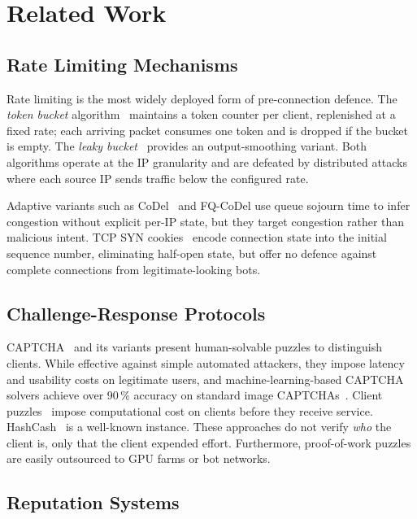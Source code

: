 \documentclass[10pt,conference]{IEEEtran}
\begin{document}
\section{Related Work}
\label{sec:related}

\subsection{Rate Limiting Mechanisms}

Rate limiting is the most widely deployed form of pre-connection
defence.  The \emph{token bucket} algorithm~\cite{tanenbaum2011cn}
maintains a token counter per client, replenished at a fixed rate;
each arriving packet consumes one token and is dropped if the bucket
is empty.  The \emph{leaky bucket}~\cite{turner1986leaky} provides
an output-smoothing variant.  Both algorithms operate at the IP
granularity and are defeated by distributed attacks where each source
IP sends traffic below the configured rate.

Adaptive variants such as CoDel~\cite{nichols2012controlling} and
FQ-CoDel use queue sojourn time to infer congestion without explicit
per-IP state, but they target congestion rather than malicious intent.
TCP SYN cookies~\cite{bernstein1996syncookies} encode connection state
into the initial sequence number, eliminating half-open state, but
offer no defence against complete connections from legitimate-looking
bots.

\subsection{Challenge-Response Protocols}

CAPTCHA~\cite{vonahn2003captcha} and its variants present human-solvable
puzzles to distinguish clients.  While effective against simple
automated attackers, they impose latency and usability costs on
legitimate users, and machine-learning-based CAPTCHA solvers achieve
over 90\,\% accuracy on standard image CAPTCHAs~\cite{captchasolvml}.
Client puzzles~\cite{dwork1993pricing} impose computational cost on
clients before they receive service.  HashCash~\cite{back2002hashcash}
is a well-known instance.  These approaches do not verify
\emph{who} the client is, only that the client expended effort.
Furthermore, proof-of-work puzzles are easily outsourced to GPU farms
or bot networks.

\subsection{Reputation Systems}
\end{document}
